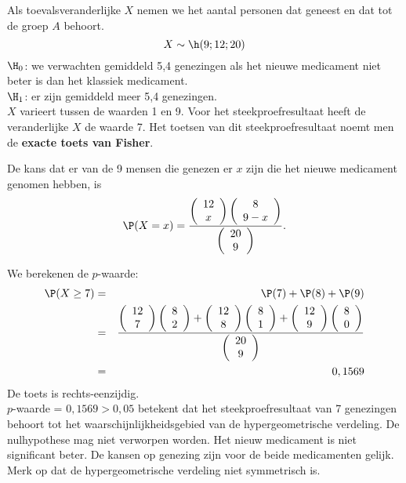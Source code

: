 {\begin{itemize}
Als toevalsveranderlijke $X$ nemen we het aantal personen dat geneest 
en dat tot de groep $A$ behoort. 
$$X\sim\h(9;12;20)$$
$\H_0$: we verwachten gemiddeld 5,4 genezingen als het nieuwe medicament niet beter is dan het klassiek 
medicament. \\
$\H_1$: er zijn gemiddeld meer  5,4 genezingen.\\
$X$ varieert tussen de waarden
1 en 9. Voor het steekproefresultaat heeft de veranderlijke $X$ de waarde 7. 
Het toetsen van dit steekproefresultaat noemt men de {\bf exacte toets van 
Fisher}.

 
De kans dat er van de 9 mensen die genezen er $x$ zijn die het nieuwe 
medicament 
genomen hebben, is
$$\P(X=x)=\frac{\left(\begin{array}{c}
12\\
x
\end{array}
\right)
\left(\begin{array}{c}
8\\
9-x
\end{array}
\right)}
{\left(\begin{array}{c}
20\\
9
\end{array}
\right)}.$$


We berekenen de $p$-waarde:
\begin{eqnarray*}
\P(X\geq 7) & = &
\P(7)+\P(8)+\P(9)\\
& = & \frac{\left(\begin{array}{c}
12\\
7
\end{array}
\right)
\left(\begin{array}{c}
8\\
2
\end{array}
\right)+
\left(\begin{array}{c}
12\\
8
\end{array}
\right)
\left(\begin{array}{c}
8\\
1
\end{array}
\right)+
\left(\begin{array}{c}
12\\
9
\end{array}
\right)
\left(\begin{array}{c}
8\\
0
\end{array}
\right)}
{\left(\begin{array}{c}
20\\
9
\end{array}
\right)}\\
 & = & 0,1569
\end{eqnarray*}
De toets is rechts-eenzijdig.\\
$p$-waarde = $0,1569>0,05$ betekent dat het steekproefresultaat van 7 genezingen behoort 
tot het waar\-schijn\-lijk\-heidsgebied van de hypergeometrische verdeling. De nulhypothese mag niet verworpen worden. Het nieuw medicament is niet significant beter. De kansen op genezing zijn voor de beide medicamenten 
gelijk. \\
Merk op dat de hypergeometrische verdeling niet symmetrisch is.


\end{itemize}}
